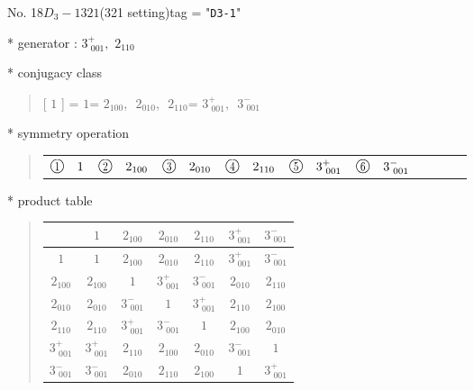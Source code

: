 \documentclass[fleqn,10pt,landscape]{jsarticle}
\begin{document}
\newpage

No. 18\quad$D_{3}-1$\quad$321$\quad(321 setting)\quad[ trigonal ]
tag = "{\tt D3-1}"

* generator : $3^{+}_{\,\,001},\,\,2{}_{110}$

* conjugacy class
\begin{quote}
[ $1$ ] = \quad $1$\newline[ $2{}_{100}$ ] = \quad $2{}_{100}$,\,\, $2{}_{010}$,\,\, $2{}_{110}$\newline[ $3^{+}_{\,\,001}$ ] = \quad $3^{+}_{\,\,001}$,\,\, $3^{-}_{\,\,001}$\newline
\end{quote}

* symmetry operation
\begin{quote}
\begin{tabular}{llllllllll}
$ {\ooalign{\hfil\resizebox{.8\width}{\height}{1}\hfil\crcr\raise.1ex\hbox{\large$\bigcirc$}}}\quad 1 $ & $ {\ooalign{\hfil\resizebox{.8\width}{\height}{2}\hfil\crcr\raise.1ex\hbox{\large$\bigcirc$}}}\quad 2{}_{100} $ & $ {\ooalign{\hfil\resizebox{.8\width}{\height}{3}\hfil\crcr\raise.1ex\hbox{\large$\bigcirc$}}}\quad 2{}_{010} $ & $ {\ooalign{\hfil\resizebox{.8\width}{\height}{4}\hfil\crcr\raise.1ex\hbox{\large$\bigcirc$}}}\quad 2{}_{110} $ & $ {\ooalign{\hfil\resizebox{.8\width}{\height}{5}\hfil\crcr\raise.1ex\hbox{\large$\bigcirc$}}}\quad 3^{+}_{\,\,001} $ & $ {\ooalign{\hfil\resizebox{.8\width}{\height}{6}\hfil\crcr\raise.1ex\hbox{\large$\bigcirc$}}}\quad 3^{-}_{\,\,001} $
\end{tabular}
\end{quote}

* product table
\begin{quote}
\begin{tabular}{ccccccc} \hline \hline
 & $ 1 $ & $ 2{}_{100} $ & $ 2{}_{010} $ & $ 2{}_{110} $ & $ 3^{+}_{\,\,001} $ & $ 3^{-}_{\,\,001} $ \\ \hline
$ 1 $ & $ 1 $ & $ 2{}_{100} $ & $ 2{}_{010} $ & $ 2{}_{110} $ & $ 3^{+}_{\,\,001} $ & $ 3^{-}_{\,\,001} $ \\
$ 2{}_{100} $ & $ 2{}_{100} $ & $ 1 $ & $ 3^{+}_{\,\,001} $ & $ 3^{-}_{\,\,001} $ & $ 2{}_{010} $ & $ 2{}_{110} $ \\
$ 2{}_{010} $ & $ 2{}_{010} $ & $ 3^{-}_{\,\,001} $ & $ 1 $ & $ 3^{+}_{\,\,001} $ & $ 2{}_{110} $ & $ 2{}_{100} $ \\
$ 2{}_{110} $ & $ 2{}_{110} $ & $ 3^{+}_{\,\,001} $ & $ 3^{-}_{\,\,001} $ & $ 1 $ & $ 2{}_{100} $ & $ 2{}_{010} $ \\
$ 3^{+}_{\,\,001} $ & $ 3^{+}_{\,\,001} $ & $ 2{}_{110} $ & $ 2{}_{100} $ & $ 2{}_{010} $ & $ 3^{-}_{\,\,001} $ & $ 1 $ \\
$ 3^{-}_{\,\,001} $ & $ 3^{-}_{\,\,001} $ & $ 2{}_{010} $ & $ 2{}_{110} $ & $ 2{}_{100} $ & $ 1 $ & $ 3^{+}_{\,\,001} $ \\
 \hline \hline
\end{tabular}
\end{quote}
\end{document}

